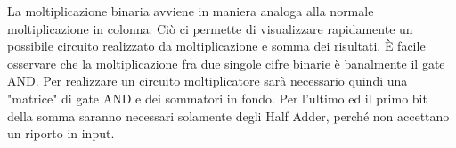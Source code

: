 La moltiplicazione binaria avviene in maniera analoga alla normale moltiplicazione in colonna. Ciò ci permette di visualizzare rapidamente un possibile circuito realizzato da moltiplicazione e somma dei risultati. È facile osservare che la moltiplicazione fra due singole cifre binarie è banalmente il gate AND. Per realizzare un circuito moltiplicatore sarà necessario quindi una "matrice" di gate AND e dei sommatori in fondo. Per l'ultimo ed il primo bit della somma saranno necessari solamente degli Half Adder, perché non accettano un riporto in input.




